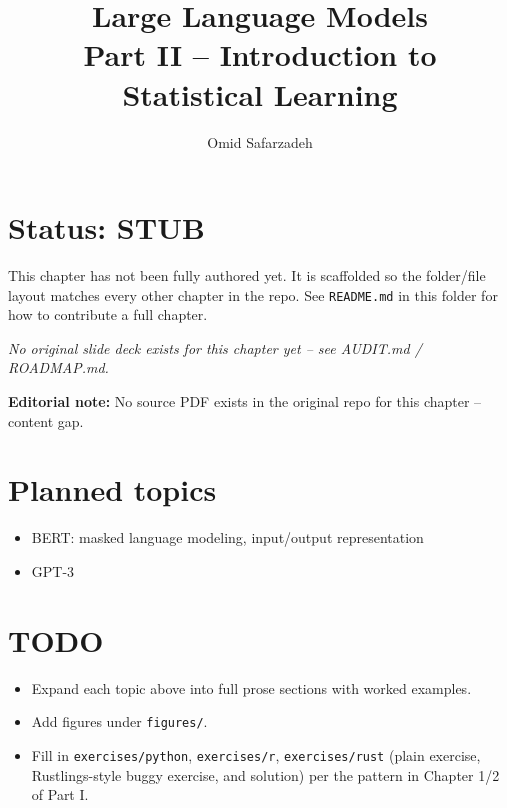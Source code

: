\documentclass[11pt]{article}
\title{Large Language Models \\ \large Part II -- Introduction to Statistical Learning}
\author{Omid Safarzadeh}
\date{}
\begin{document}
\maketitle

\section*{Status: STUB}
This chapter has not been fully authored yet. It is scaffolded so the
folder/file layout matches every other chapter in the repo. See
\texttt{README.md} in this folder for how to contribute a full chapter.

\textit{No original slide deck exists for this chapter yet -- see AUDIT.md / ROADMAP.md.}

\par\noindent\textbf{Editorial note:} No source PDF exists in the original repo for this chapter -- content gap.

\section*{Planned topics}
\begin{itemize}
  \item BERT: masked language modeling, input/output representation
  \item GPT-3
\end{itemize}

\section*{TODO}
\begin{itemize}
  \item Expand each topic above into full prose sections with worked examples.
  \item Add figures under \texttt{figures/}.
  \item Fill in \texttt{exercises/python}, \texttt{exercises/r}, \texttt{exercises/rust}
        (plain exercise, Rustlings-style buggy exercise, and solution) per the
        pattern in Chapter 1/2 of Part I.
\end{itemize}
\end{document}
